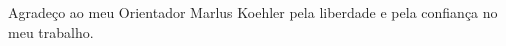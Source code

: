 \documentclass[
	12pt,				%
	openright,			%
	twoside,			%
	a4paper,			%
	english,			%
	french,				%
	spanish,			%
	brazil				%
	]{abntex2}
\begin{document}
%      
%  


\begin{agradecimentos}
Agradeço ao meu Orientador Marlus Koehler pela liberdade e pela confiança no meu trabalho.

\end{agradecimentos}


\end{document}
